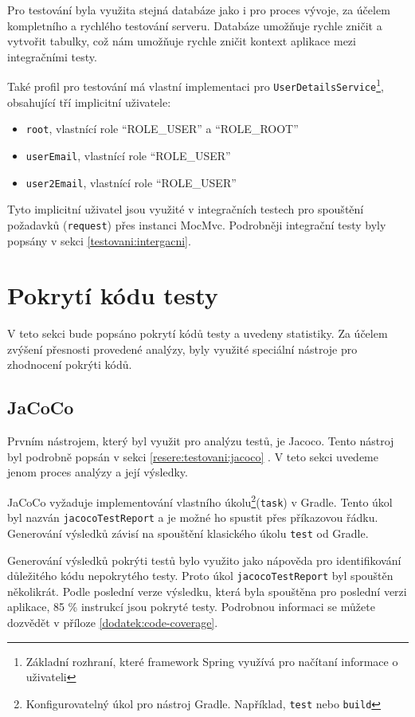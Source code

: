     Pro testování byla  využita stejná databáze jako i pro proces vývoje, za účelem kompletního a rychlého testování serveru. Databáze umožňuje rychle zničit a vytvořit tabulky, což nám umožňuje rychle zničit kontext aplikace mezi integračními testy.
    
    Také profil pro testování má vlastní implementaci pro \verb|UserDetailsService|\footnote{Základní rozhraní, které framework Spring využívá pro načítaní informace o uživateli}, obsahující tří implicitní uživatele:
    \begin{itemize}
            \item \verb|root|, vlastnící role \enquote{ROLE\_USER} a \enquote{ROLE\_ROOT} 
            \item \verb|userEmail|, vlastnící role \enquote{ROLE\_USER}
            \item \verb|user2Email|, vlastnící role \enquote{ROLE\_USER}
    \end{itemize}
    Tyto implicitní uživatel jsou využité v integračních testech pro spouštění požadavků (\verb|request|) přes instanci MocMvc. Podrobněji integrační testy byly popsány v sekci \ref{testovani:intergacni}.
    
\section{Pokrytí kódu testy}\label{testovani:pokryti}
    V teto sekci bude popsáno pokrytí kódů testy a uvedeny statistiky. Za účelem zvýšení přesnosti provedené analýzy, byly využité speciální nástroje pro zhodnocení pokrýti kódů.
    
    \subsection{JaCoCo}
    Prvním nástrojem, který byl využit pro analýzu testů, je Jacoco. Tento nástroj byl podrobně popsán v sekci \ref{resere:testovani:jacoco} . V teto sekci uvedeme jenom proces analýzy a její výsledky.
    
    JaCoCo vyžaduje implementování vlastního úkolu\footnote{Konfigurovatelný úkol pro nástroj Gradle. Například, \texttt{test} nebo \texttt{build}}(\verb|task|) v Gradle. Tento úkol byl nazván \verb|jacocoTestReport| a je možné ho spustit přes příkazovou řádku. Generování výsledků závisí na spouštění klasického úkolu \verb|test| od Gradle. 
    
    Generování výsledků pokrýti testů bylo využito jako nápověda pro identifikování důležitého kódu nepokrytého testy. Proto úkol \verb|jacocoTestReport| byl spouštěn několikrát. Podle poslední verze výsledku, která byla spouštěna pro poslední verzi aplikace, 85 \% instrukcí jsou pokryté testy. Podrobnou informaci se můžete dozvědět v příloze \ref{dodatek:code-coverage}.
